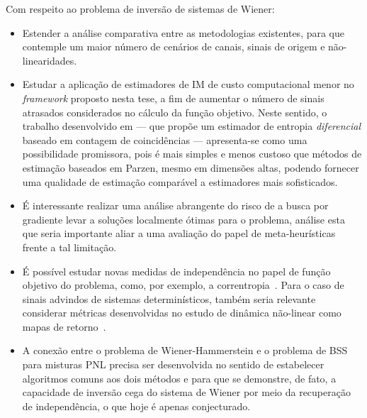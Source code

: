 Com respeito ao problema de inversão de sistemas de Wiener:
\begin{itemize}
	\item Estender a análise comparativa entre as metodologias existentes, para que contemple um maior número de cenários de canais, sinais de origem e não-linearidades.
	\item Estudar a aplicação de estimadores de IM de custo computacional menor no \emph{framework} proposto nesta tese, a fim de aumentar o número de sinais atrasados considerados no cálculo da função objetivo. Neste sentido, o trabalho desenvolvido em \cite{Montalvao2013} --- que propõe um estimador de entropia \emph{diferencial} baseado em contagem de coincidências --- apresenta-se como uma possibilidade promissora, pois é mais simples e menos custoso que  métodos de estimação baseados em Parzen, mesmo em dimensões altas, podendo fornecer uma qualidade de estimação comparável a estimadores mais sofisticados.
	\item É interessante realizar uma análise abrangente do risco de a busca por gradiente levar a soluções localmente ótimas para o problema, análise esta que seria importante aliar a uma avaliação do papel de meta-heurísticas frente a tal limitação.
	\item É possível estudar novas medidas de independência no papel de função objetivo do problema, como, por exemplo, a correntropia~\cite{Santamaria2006}. Para o caso de sinais advindos de sistemas determinísticos, também seria relevante considerar métricas desenvolvidas no estudo de dinâmica não-linear como mapas de retorno~\cite{Marwan2007}.
	\item A conexão entre o problema de Wiener-Hammerstein e o problema de BSS para misturas PNL precisa ser desenvolvida no sentido de estabelecer algoritmos comuns aos dois métodos e para que se demonstre, de fato, a capacidade de inversão cega do sistema de Wiener por meio da recuperação de independência, o que hoje é apenas conjecturado.
\end{itemize}

